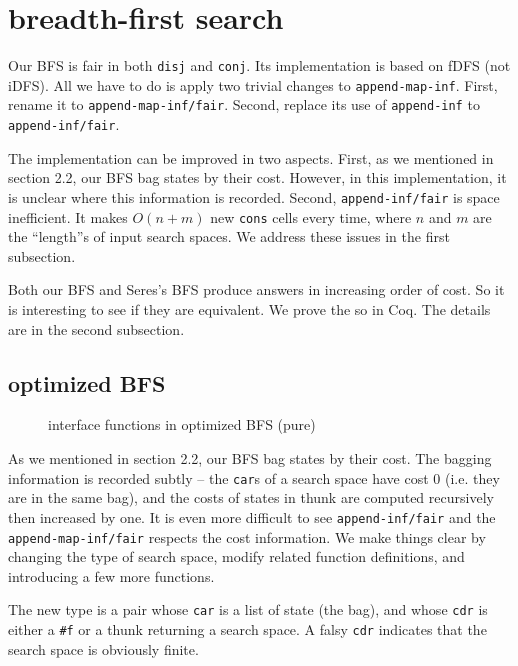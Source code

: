 \documentclass[format=acmlarge, review=true, authordraft=true]{acmart}
\newcommand{\conj}{\texttt{conj}}
\newcommand{\disj}{\texttt{disj}}
\begin{document}
\section{breadth-first search}

Our BFS is fair in both \disj{} and \conj{}. Its implementation is based on 
fDFS (not iDFS). All we have to do is apply two trivial changes to 
\texttt{append-map-inf}. First, rename it to \texttt{append-map-inf/fair}. 
Second, replace its use of \texttt{append-inf} to \texttt{append-inf/fair}. 

The implementation can be improved in two aspects. First, as we mentioned in 
section 2.2, our BFS bag states by their cost. However, in this implementation, 
it is unclear where this information is recorded. Second, 
\texttt{append-inf/fair} is space inefficient. It makes $O(n+m)$ new 
\texttt{cons} cells every time, where $n$ and $m$ are the ``length''s of 
input search spaces. We address these issues in the first subsection.

Both our BFS and Seres's BFS \citep{seres1999algebra} produce answers in 
increasing order of cost. So it is interesting to see if they are equivalent. 
We prove the so in Coq. The details are in the second subsection.

\subsection{optimized BFS}

\begin{figure}
		
	\caption{interface functions in optimized BFS (pure)}
	\label{BFS-opt}
\end{figure}

As we mentioned in section 2.2, our BFS bag states by their cost. The bagging 
information is recorded subtly -- the \texttt{car}s of a search space have cost 
0 (i.e. they are in the same bag), and the costs of states in thunk are 
computed recursively then increased by one. It is even more difficult to see 
\texttt{append-inf/fair} and the \texttt{append-map-inf/fair} respects the cost 
information. We make things clear by changing the type of search space, modify 
related function definitions, and introducing a few more functions.

The new type is a pair whose \texttt{car} is a list of state (the bag), and 
whose \texttt{cdr} is either a \texttt{\#{}f} or a thunk returning a search 
space. A falsy \texttt{cdr} indicates that the search space is obviously 
finite. 
\end{document}
